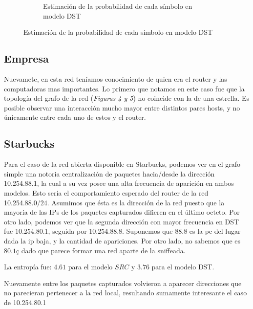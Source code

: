 \begin{figure}[H]
\begin{subfigure}{0.4\textwidth}
		\caption{Estimaci\'on de la probabilidad de cada s\'imbolo en modelo DST}
	\end{subfigure}
\end{figure}


\subsection{Empresa}

Nuevamete, en esta red teníamos conocimiento de quien era el router y las computadoras mas 
importantes. 
Lo primero que notamos en este caso fue que la topología del grafo de la red (\emph{Figuras 4 y 5})
no coincide con la de una estrella. Es posible observar una interacción mucho mayor 
entre distintos pares hosts, y no únicamente entre cada uno de estos y el router.

\subsection{Starbucks}


Para el caso de la red abierta disponible en Starbucks, podemos ver en el 
grafo simple una notoria centralizaci\'on de paquetes hacia/desde la direcci\'on
10.254.88.1, la cual a su vez posee una alta frecuencia de aparici\'on en ambos
modelos. Esto ser\'ia el comportamiento esperado del router de la red
10.254.88.0/24. Asumimos que \'esta es la direcci\'on de la red puesto que 
la mayor\'ia de las IPs de los paquetes capturados difieren en el \'ultimo octeto.
Por otro lado, podemos ver que la segunda direcci\'on con mayor frecuencia en DST
fue 10.254.80.1, seguida por 10.254.88.8. Suponemos que $88.8$ es la pc del lugar
dada la ip baja, y la cantidad de apariciones. Por otro lado, no sabemos que es
$80.1ç$ dado que parece formar una red aparte de la sniffeada.

La entrop\'ia fue: $4.61$ para el modelo $SRC$ y $3.76$ para el modelo
DST.


Nuevamente entre los paquetes capturados volvieron a aparecer direcciones que
no parecieran pertenecer a la red local, resultando sumamente interesante el caso
de 10.254.80.1


